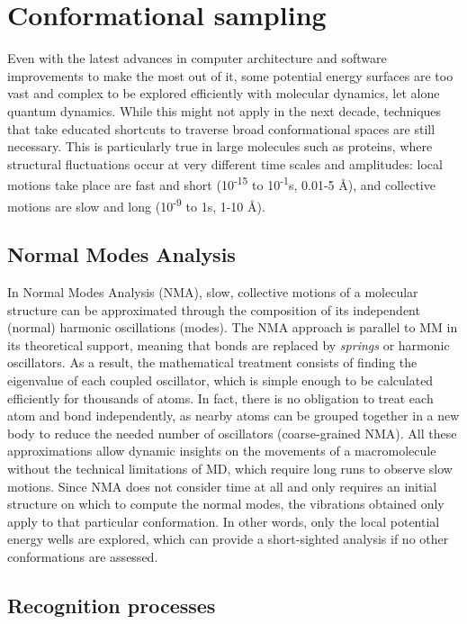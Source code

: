 \section{Conformational sampling}

Even with the latest advances in computer architecture and software improvements to make the most out of it, some potential energy surfaces are too vast and complex to be explored efficiently with molecular dynamics, let alone quantum dynamics. While this might not apply in the next decade, techniques that take educated shortcuts to traverse broad conformational spaces are still necessary. This is particularly true in large molecules such as proteins, where structural fluctuations occur at very different time scales and amplitudes: local motions take place are fast and short (10\textsuperscript{-15} to 10\textsuperscript{-1}s, 0.01-5 \AA), and collective motions are slow and long (10\textsuperscript{-9} to 1s, 1-10 \AA).

\subsection{Normal Modes Analysis}

In Normal Modes Analysis (NMA), slow, collective motions of a molecular structure can be approximated through the composition of its independent (normal) harmonic oscillations (modes). The NMA approach is parallel to MM in its theoretical support, meaning that bonds are replaced by \textit{springs} or harmonic oscillators. As a result, the mathematical treatment consists of finding the eigenvalue of each coupled oscillator, which is simple enough to be calculated efficiently for thousands of atoms. In fact, there is no obligation to treat each atom and bond independently, as nearby atoms can be grouped together in a new body to reduce the needed number of oscillators (coarse-grained NMA). All these approximations allow dynamic insights on the movements of a macromolecule without the technical limitations of MD, which require long runs to observe slow motions. Since NMA does not consider time at all and only requires an initial structure on which to compute the normal modes, the vibrations obtained only apply to that particular conformation. In other words, only the local potential energy wells are explored, which can provide a short-sighted analysis if no other conformations are assessed.

\subsection{Recognition processes}


